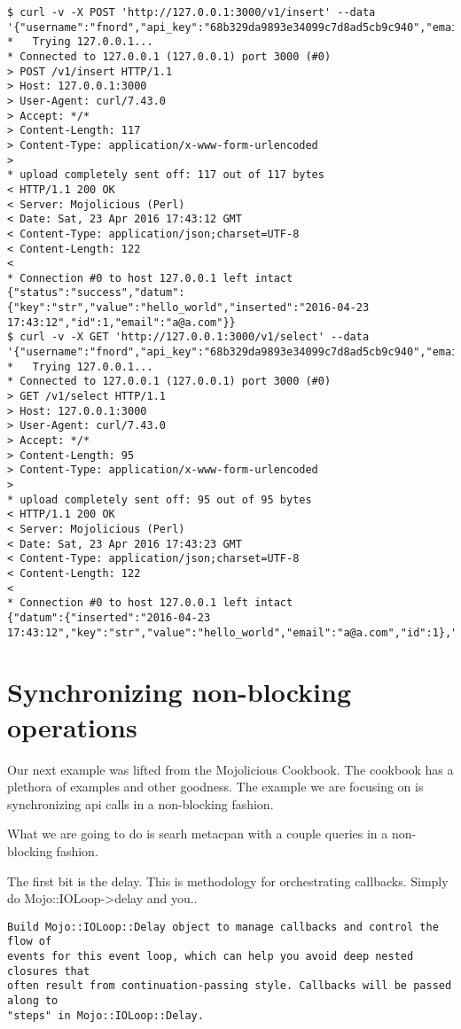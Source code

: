 \documentclass[14pt]{extreport}
\begin{document}
\begin{lstlisting}[style=BashOutputStyle]
$ curl -v -X POST 'http://127.0.0.1:3000/v1/insert' --data '{"username":"fnord","api_key":"68b329da9893e34099c7d8ad5cb9c940","email":"a@a.com","key":"str","value":"hello_world"}'
*   Trying 127.0.0.1...
* Connected to 127.0.0.1 (127.0.0.1) port 3000 (#0)
> POST /v1/insert HTTP/1.1
> Host: 127.0.0.1:3000
> User-Agent: curl/7.43.0
> Accept: */*
> Content-Length: 117
> Content-Type: application/x-www-form-urlencoded
> 
* upload completely sent off: 117 out of 117 bytes
< HTTP/1.1 200 OK
< Server: Mojolicious (Perl)
< Date: Sat, 23 Apr 2016 17:43:12 GMT
< Content-Type: application/json;charset=UTF-8
< Content-Length: 122
< 
* Connection #0 to host 127.0.0.1 left intact
{"status":"success","datum":{"key":"str","value":"hello_world","inserted":"2016-04-23 17:43:12","id":1,"email":"a@a.com"}}
$ curl -v -X GET 'http://127.0.0.1:3000/v1/select' --data '{"username":"fnord","api_key":"68b329da9893e34099c7d8ad5cb9c940","email":"a@a.com","key":"str"}'
*   Trying 127.0.0.1...
* Connected to 127.0.0.1 (127.0.0.1) port 3000 (#0)
> GET /v1/select HTTP/1.1
> Host: 127.0.0.1:3000
> User-Agent: curl/7.43.0
> Accept: */*
> Content-Length: 95
> Content-Type: application/x-www-form-urlencoded
> 
* upload completely sent off: 95 out of 95 bytes
< HTTP/1.1 200 OK
< Server: Mojolicious (Perl)
< Date: Sat, 23 Apr 2016 17:43:23 GMT
< Content-Type: application/json;charset=UTF-8
< Content-Length: 122
< 
* Connection #0 to host 127.0.0.1 left intact
{"datum":{"inserted":"2016-04-23 17:43:12","key":"str","value":"hello_world","email":"a@a.com","id":1},"status":"success"}
\end{lstlisting}

\section{Synchronizing non-blocking operations}

Our next example was lifted from the Mojolicious Cookbook.  The cookbook has a
plethora of examples and other goodness.  The example we are focusing on is
synchronizing api calls in a non-blocking fashion.

What we are going to do is searh metacpan with a couple queries in a
non-blocking fashion.

The first bit is the delay.  This is methodology for orchestrating callbacks.  Simply do
Mojo::IOLoop->delay and you..

\begin{lstlisting}[style=BlockStyle]
Build Mojo::IOLoop::Delay object to manage callbacks and control the flow of
events for this event loop, which can help you avoid deep nested closures that
often result from continuation-passing style. Callbacks will be passed along to
"steps" in Mojo::IOLoop::Delay.
\end{lstlisting}
\end{document}
